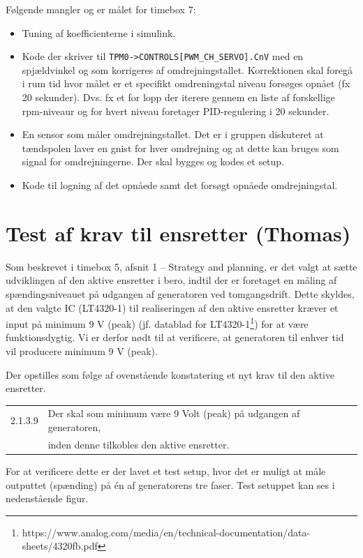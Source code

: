 Følgende mangler og er målet for timebox 7:
\begin{itemize}
\item Tuning af koefficienterne i simulink.
\item Kode der skriver til \lstinline{TPM0->CONTROLS[PWM_CH_SERVO].CnV} med en spjældvinkel og som korrigeres af omdrejningstallet. Korrektionen skal foregå i rum tid hvor målet er et specifikt omdreningstal niveau forsøges opnået (fx 20 sekunder). Dvs. fx et for lopp der iterere gennem en liste af forskellige rpm-niveaur og for hvert niveau foretager PID-regulering i 20 sekunder.
\item En sensor som måler omdrejningstallet. Det er i gruppen diskuteret at tændspolen laver en gnist for hver omdrejning og at dette kan bruges som signal for omdrejningerne. Der skal bygges og kodes et setup.
\item Kode til logning af det opnåede samt det forsøgt opnåede omdrejningstal.
\end{itemize}
\clearpage
\section{Test af krav til ensretter (Thomas)}
\label{sec:test-af-krav}

Som beskrevet i timebox 5, afsnit 1 – Strategy and planning, er det valgt at sætte udviklingen af den aktive ensretter i bero, indtil der er foretaget en måling af spændingsniveauet på udgangen af generatoren ved tomgangsdrift. Dette skyldes, at den valgte IC (LT4320-1) til realiseringen af den aktive ensretter kræver et input på minimum 9 V (peak) (jf. datablad for LT4320-1\footnote{https://www.analog.com/media/en/technical-documentation/data-sheets/4320fb.pdf}) for at være funktionsdygtig. Vi er derfor nødt til at verificere, at generatoren til enhver tid vil producere minimum 9 V (peak). 

Der opstilles som følge af ovenstående konstatering et nyt krav til den aktive ensretter.\vspace{5mm}\\
\begin{tabular}[h]{ll}
  2.1.3.9&Der skal som minimum være 9 Volt (peak) på udgangen af generatoren,\\
           &inden denne tilkobles den aktive ensretter.\\
\end{tabular}
\vspace{2em}
\newline
For at verificere dette er der lavet et test setup, hvor det er muligt at måle outputtet (spænding) på én af generatorens tre faser. Test setuppet kan ses i nedenstående figur.

